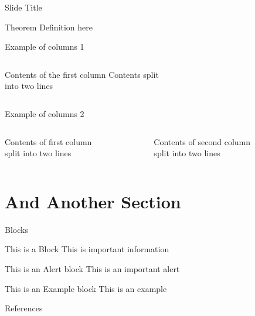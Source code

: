 \begin{frame}{Slide Title}
\begin{exampleblock}
{Theorem}
Definition here
\end{exampleblock}
\end{frame}

\begin{frame}{Example of columns 1}
 \begin{columns}[c]
  Contents of the first column
  Contents split \\ into two lines
 \end{columns}
\end{frame}
 
\begin{frame}{Example of columns 2}
 \begin{columns}[T]
  \begin{column}[T]{5cm}
   Contents of first column \\ split into two lines
  \end{column}
  \begin{column}[T]{5cm}
   Contents of second column \\ split into two lines
  \end{column}
 \end{columns}
\end{frame}

\section{And Another Section}

\begin{frame}{Blocks}
 \begin{block}{This is a Block}
   This is important information
 \end{block}

 \begin{alertblock}{This is an Alert block}
   This is an important alert
 \end{alertblock}
  
 \begin{exampleblock}{This is an Example block}
  This is an example 
 \end{exampleblock}
\end{frame}

\begin{frame}{References}




\end{frame}

